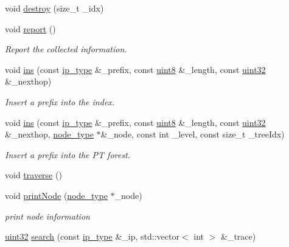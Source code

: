 \begin{DoxyCompactItemize}
void \hyperlink{classRPTree_a6ed417f3287c9331343f226d16cdf236}{destroy} (size\-\_\-t \-\_\-idx)
\item 
void \hyperlink{classRPTree_a989522de83f92486a90704d3e6d7c3e1}{report} ()
\begin{DoxyCompactList}\small\item\em Report the collected information. \end{DoxyCompactList}\item 
void \hyperlink{classRPTree_ab419c35b920e2a948df53b75e6876836}{ins} (const \hyperlink{classRPTree_a247a4b90a027365aa8cc94c69ba141d1}{ip\-\_\-type} \&\-\_\-prefix, const \hyperlink{types_8h_a34ecedcf03a70dc91e4616212d79267d}{uint8} \&\-\_\-length, const \hyperlink{types_8h_abd01e8e67e3d94cab04ecaaf4f85ac1b}{uint32} \&\-\_\-nexthop)
\begin{DoxyCompactList}\small\item\em Insert a prefix into the index. \end{DoxyCompactList}\item 
void \hyperlink{classRPTree_afdb7d889168ddf86144fae87f8a2c6ce}{ins} (const \hyperlink{classRPTree_a247a4b90a027365aa8cc94c69ba141d1}{ip\-\_\-type} \&\-\_\-prefix, const \hyperlink{types_8h_a34ecedcf03a70dc91e4616212d79267d}{uint8} \&\-\_\-length, const \hyperlink{types_8h_abd01e8e67e3d94cab04ecaaf4f85ac1b}{uint32} \&\-\_\-nexthop, \hyperlink{classRPTree_a9ebcf5a1e56890f2ab50a8a1c700c35f}{node\-\_\-type} $\ast$\&\-\_\-node, const int \-\_\-level, const size\-\_\-t \-\_\-tree\-Idx)
\begin{DoxyCompactList}\small\item\em Insert a prefix into the P\-T forest. \end{DoxyCompactList}\item 
void \hyperlink{classRPTree_a63ddee55e74d45b22980ba5784d496f7}{traverse} ()
\item 
void \hyperlink{classRPTree_a1a6ed5efd21d573bb3dad005dab714d8}{print\-Node} (\hyperlink{classRPTree_a9ebcf5a1e56890f2ab50a8a1c700c35f}{node\-\_\-type} $\ast$\-\_\-node)
\begin{DoxyCompactList}\small\item\em print node information \end{DoxyCompactList}\item 
\hyperlink{types_8h_abd01e8e67e3d94cab04ecaaf4f85ac1b}{uint32} \hyperlink{classRPTree_a06bd1de67bc2d781a47187eacb8407ac}{search} (const \hyperlink{classRPTree_a247a4b90a027365aa8cc94c69ba141d1}{ip\-\_\-type} \&\-\_\-ip, std\-::vector$<$ int $>$ \&\-\_\-trace)

\end{DoxyCompactItemize}
